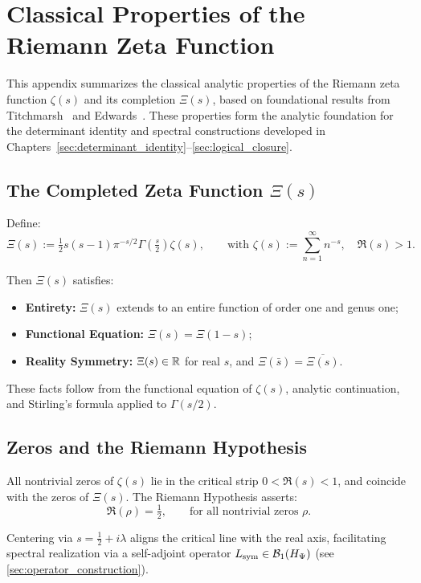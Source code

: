 \section{Classical Properties of the Riemann Zeta Function}
\label{app:zeta_function_background}

This appendix summarizes the classical analytic properties of the Riemann zeta function \( \zeta(s) \) and its completion \( \Xi(s) \), based on foundational results from Titchmarsh~\cite{Titchmarsh1986Zeta} and Edwards~\cite{Edwards1974Zeta}. These properties form the analytic foundation for the determinant identity and spectral constructions developed in Chapters~\ref{sec:determinant_identity}–\ref{sec:logical_closure}.

\subsection*{The Completed Zeta Function \( \Xi(s) \)}

Define:
\[
\Xi(s) := \tfrac{1}{2} s(s - 1) \pi^{-s/2} \Gamma\left( \tfrac{s}{2} \right) \zeta(s),
\qquad \text{with } \zeta(s) := \sum_{n=1}^\infty n^{-s}, \quad \Re(s) > 1.
\]

Then \( \Xi(s) \) satisfies:
\begin{itemize}
  \item \textbf{Entirety:} \( \Xi(s) \) extends to an entire function of order one and genus one;
  \item \textbf{Functional Equation:} \( \Xi(s) = \Xi(1 - s) \);
  \item \textbf{Reality Symmetry:} \( \Xi(s) \in \mathbb{R} \) for real \( s \), and \( \Xi(\bar{s}) = \overline{\Xi(s)} \).
\end{itemize}

These facts follow from the functional equation of \( \zeta(s) \), analytic continuation, and Stirling’s formula applied to \( \Gamma(s/2) \).

\subsection*{Zeros and the Riemann Hypothesis}

All nontrivial zeros of \( \zeta(s) \) lie in the critical strip \( 0 < \Re(s) < 1 \), and coincide with the zeros of \( \Xi(s) \). The Riemann Hypothesis asserts:
\[
\Re(\rho) = \tfrac{1}{2}, \qquad \text{for all nontrivial zeros } \rho.
\]

Centering via \( s = \tfrac{1}{2} + i\lambda \) aligns the critical line with the real axis, facilitating spectral realization via a self-adjoint operator \( L_{\mathrm{sym}} \in \mathcal{B}_1(H_{\Psi}) \) (see \cref{sec:operator_construction}).

